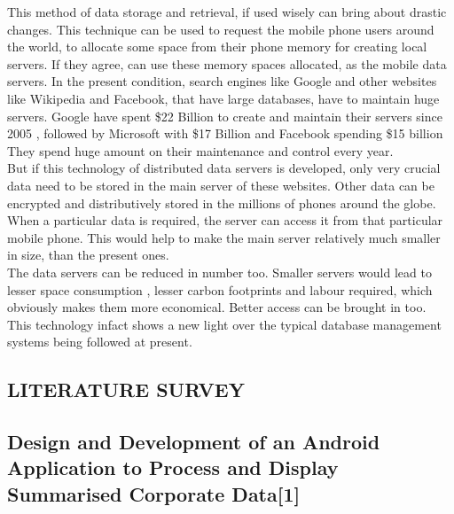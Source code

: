 \documentclass[12pt, a4paper]{article}
\begin{document}
\hspace{5mm} This method of data storage and retrieval, if used wisely can bring about drastic changes. This technique can be used to request the mobile phone users around the world, to allocate some space from their phone memory for creating local servers. If they agree, can use these memory spaces allocated, as the mobile data servers. In the present condition, search engines like Google and other websites like Wikipedia and Facebook, that have large databases, have to maintain huge servers. Google have spent \$22 Billion to create and maintain their servers since 2005 , followed by Microsoft with \$17 Billion and Facebook spending \$15 billion They spend  huge amount on their maintenance and control every year.
\\

\hspace{5mm}But if this technology of distributed data servers is developed, only very crucial data need to be stored in the main server of these websites. Other data can be encrypted and distributively stored in the millions of phones around the globe. When a particular data is required, the server can access it from that particular mobile phone. This would help to make the main server relatively much smaller in size, than the present ones.
\\

\hspace{5mm} The data servers can be reduced in number too. Smaller servers would lead to lesser space consumption , lesser carbon footprints and labour required, which obviously makes them more economical. Better access can be brought in too. This technology infact shows a new light over the typical database management systems being followed at present.\\

\vspace{5mm} 
\begin{center}
\section{LITERATURE SURVEY}\vspace{5mm}
\end{center}

\subsection{Design and Development of an Android Application to Process and Display Summarised Corporate Data[1]}
\end{document}

